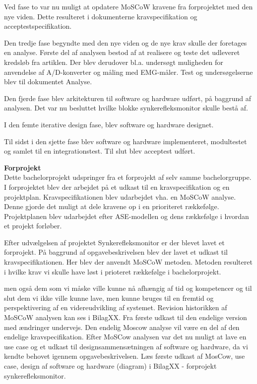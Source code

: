 Ved fase to var nu muligt at opdatere MoSCoW kravene fra forprojektet med den nye viden. Dette resulteret i dokumenterne kravspecifikation og acceptestspecifikation. 

Den tredje fase begyndte med den nye viden og de nye krav skulle der foretages en analyse. Første del af analysen bestod af at realisere og teste det udleveret kredsløb fra artiklen. Der blev derudover bl.a. undersøgt muligheden for anvendelse af A/D-konverter og måling med EMG-måler. Test og undersøgelserne blev til dokumentet Analyse.

Den fjerde fase blev arkitekturen til software og hardware udført, på baggrund af analysen. Det var nu besluttet hvilke blokke synkerefleksmonitor skulle bestå af. 

I den femte iterative design fase, blev software og hardware designet.  

Til sidst i den sjette fase blev software og hardware implementeret, modultestet og samlet til en integrationstest. Til slut blev acceptest udført. 





  
 \textbf{Forprojekt}\\

Dette bachelorprojekt udspringer fra et forprojekt af selv samme bachelorgruppe. I forprojektet blev der arbejdet på et udkast til en kravspecifikation og en projektplan. Kravspecifikationen blev udarbejdet vha. en MoSCoW analyse. Denne gjorde det muligt at dele kravene op i en prioriteret rækkefølge.  Projektplanen blev udarbejdet efter ASE-modellen og dens rækkefølge i hvordan et projekt forløber. 


Efter udvælgelsen af projektet Synkerefleksmonitor er der blevet lavet et forprojekt. På baggrund af opgavebeskrivelsen blev der lavet et udkast til kravspecifikationen. Her blev der anvendt MoSCoW metoden. Metoden resulteret i hvilke krav vi skulle have løst i prioteret rækkefølge i bachelorprojekt. 
 
 
 
 
 
  men også dem som vi måske ville kunne nå afhængig af tid og kompetencer og til slut dem vi ikke ville kunne lave, men kunne bruges til en fremtid og perspektivering af en videreudvikling af systemet. Revision historikken af MoSCoW analysen kan ses i BilagXX. Fra første udkast til den endelige version med ændringer undervejs. Den endelig Moscow analyse vil være en del af den endelige kravspecifikation. Efter MoSCow analysen var det nu muligt at lave en use case og et udkast til designsammensætningen af software og hardware, da vi kendte behovet igennem opgavebeskrivelsen. Læs første udkast af MosCow, use case, design af software og hardware (diagram) i BilagXX - forprojekt synkerefleksmonitor. 
 

